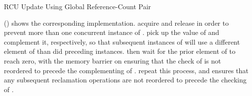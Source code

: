 \begin{listing}[tbp]

\caption{RCU Update Using Global Reference-Count Pair}
\label{lst:app:toyrcu:RCU Update Using Global Reference-Count Pair}
\end{listing}

\begin{fcvref}
()
shows the corresponding  implementation.
 acquire and release  in order to
prevent more than one concurrent instance of .
 pick up the value of  and complement it,
respectively, so that subsequent instances of 
will use a different element of  than did preceding
instances.
then wait for the prior element of  to
reach zero, with the memory barrier on  ensuring that the check
of  is not reordered to precede the complementing of
.
 repeat this process, and
 ensures that any
subsequent reclamation operations are not reordered to precede the
checking of .
\end{fcvref}

